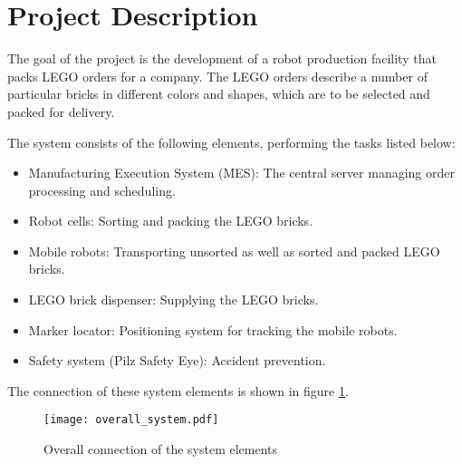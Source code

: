 \chapter*{Project Description}\label{chap:project_description}


The goal of the project is the development of a robot production facility that packs LEGO orders for a company. The LEGO orders describe a number of particular bricks in different colors and shapes, which are to be selected and packed for delivery. 

The system consists of the following elements, performing the tasks listed below:
\begin{itemize}
	\item Manufacturing Execution System (MES): The central server managing order processing and scheduling. 
	\item Robot cells: Sorting and packing the LEGO bricks. 
	\item Mobile robots: Transporting unsorted as well as sorted and packed LEGO bricks. 
	\item LEGO brick dispenser: Supplying the LEGO bricks. 
	\item Marker locator: Positioning system for tracking the mobile robots. 
	\item Safety system (Pilz Safety Eye): Accident prevention.
\end{itemize}

The connection of these system elements is shown in figure \ref{fig:overall_system_diagram}.
    \begin{figure}[H]
        \centering
        \texttt{[image: overall\_system.pdf]}
        \caption{Overall connection of the system elements}
        \label{fig:overall_system_diagram}
    \end{figure}

